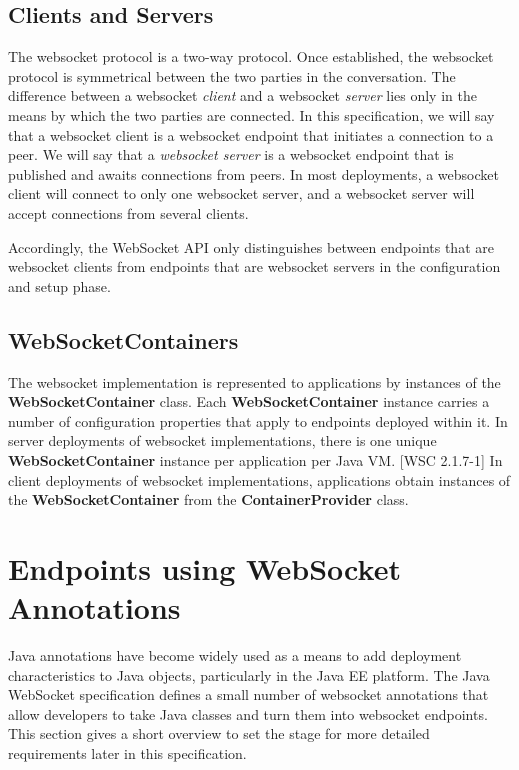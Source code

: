 \subsection{Clients and Servers}

The websocket protocol is a two-way protocol. Once established, the websocket protocol is symmetrical between the two parties in the conversation. The difference between a websocket \emph{client} and a websocket \emph{server} lies only in the means by which the two parties are connected. In this specification, we will say that a websocket client is a websocket endpoint that initiates a connection to a peer. We will say that a \emph{websocket server} is a websocket endpoint that is published and awaits connections from peers. In most deployments, a websocket client will connect to only one websocket server, and a websocket server will accept connections from several clients.

Accordingly, the WebSocket API only distinguishes between endpoints that are websocket clients from endpoints that are websocket servers in the configuration and setup phase.

\subsection{WebSocketContainers}

The websocket implementation is represented to applications by instances of the \textbf{WebSocketContainer} class. Each \textbf{WebSocketContainer} instance carries a number of configuration properties that apply to endpoints deployed within it. In server deployments of websocket implementations, there is one unique \textbf{WebSocketContainer} instance per application per Java VM. [WSC 2.1.7-1] In client deployments of websocket implementations, applications obtain instances of the \textbf{WebSocketContainer} from the \textbf{ContainerProvider} class.

\section{Endpoints using WebSocket Annotations}

Java annotations have become widely used as a means to add deployment characteristics to Java objects, particularly in the Java EE platform. The Java WebSocket specification defines a small number of websocket annotations that allow developers to take Java classes and turn them into websocket endpoints. This section gives a short overview to set the stage for more detailed requirements later in this specification.

